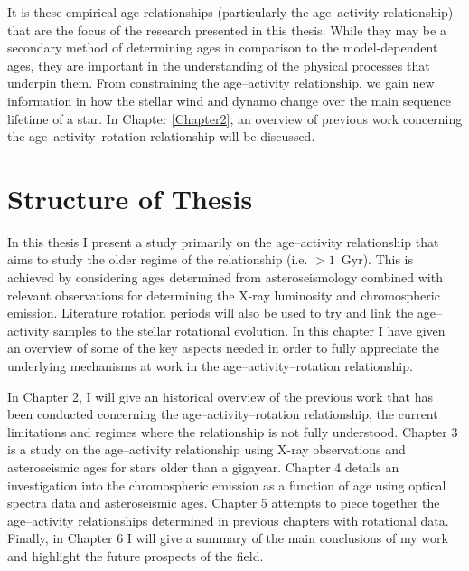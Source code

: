 It is these empirical age relationships (particularly the age--activity relationship) that are the focus of the research presented in this thesis. While they may be a secondary method of determining ages in comparison to the model-dependent ages, they are important in the understanding of the physical processes that underpin them. From constraining the age--activity relationship, we gain new information in how the stellar wind and dynamo change over the main sequence lifetime of a star. In Chapter \ref{Chapter2}, an overview of previous work concerning the age--activity--rotation relationship will be discussed.

\section{Structure of Thesis}
In this thesis I present a study primarily on the age--activity relationship that aims to study the older regime of the relationship (i.e. $> 1$~Gyr). This is achieved by considering ages determined from asteroseismology combined with relevant observations for determining the X-ray luminosity and chromospheric emission. Literature rotation periods will also be used to try and link the age--activity samples to the stellar rotational evolution. In this chapter I have given an overview of some of the key aspects needed in order to fully appreciate the underlying mechanisms at work in the age--activity--rotation relationship.

In Chapter 2, I will give an historical overview of the previous work that has been conducted concerning the age--activity--rotation relationship, the current limitations and regimes where the relationship is not fully understood. Chapter 3 is a study on the age--activity relationship using X-ray observations and asteroseismic ages for stars older than a gigayear. Chapter 4 details an investigation into the chromospheric emission as a function of age using optical spectra data and asteroseismic ages. Chapter 5 attempts to piece together the age--activity relationships determined in previous chapters with rotational data. Finally, in Chapter 6 I will give a summary of the main conclusions of my work and highlight the future prospects of the field.